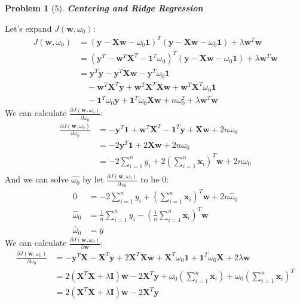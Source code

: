 \documentclass[11pt]{article}
\theoremstyle{quest}
\newtheorem*{question}{Problem}
\begin{document}
\begin{question}[5]
\textbf{Centering and Ridge Regression}
\end{question}
Let's expand $J(\textbf{w}, \omega_0)$:
\begin{align*}
J(\textbf{w}, \omega_0) &= (\textbf{y} - \textbf{X}\textbf{w} - \omega_{0}\textbf{1})^{T}(\textbf{y} - \textbf{X}\textbf{w} - \omega_{0}\textbf{1})+\lambda\textbf{w}^{T}\textbf{w}\\
 										&= (\textbf{y}^{T} - \textbf{w}^{T}\textbf{X}^{T} - \textbf{1}^{T}\omega_{0})^{T}(\textbf{y} - \textbf{X}\textbf{w} - \omega_{0}\textbf{1})+\lambda\textbf{w}^{T}\textbf{w}\\
										&= \textbf{y}^{T}\textbf{y} - \textbf{y}^{T}\textbf{Xw} - \textbf{y}^{T}\omega_{0}\textbf{1}\\
										&\quad - \textbf{w}^{T}\textbf{X}^{T}\textbf{y} + \textbf{w}^{T}\textbf{X}^{T}\textbf{X}\textbf{w} + \textbf{w}^{T}\textbf{X}^{T}\omega_0\textbf{1} \\
                    &\quad - \textbf{1}^{T}\omega_{0}\textbf{y} + \textbf{1}^{T}\omega_{0}\textbf{Xw} + n\omega_{0}^{2} + \lambda\textbf{w}^{T}\textbf{w}
\end{align*}
We can calculate $\frac{\partial J(\textbf{w}, \omega_0)}{\partial \omega_{0}}$:
\begin{align*}
\frac{\partial J(\textbf{w}, \omega_0)}{\partial \omega_{0}} &= -\textbf{y}^{T}\textbf{1} + \textbf{w}^{T}\textbf{X}^{T} -\textbf{1}^{T}\textbf{y} + \textbf{X}\textbf{w} + 2n\omega_{0}\\
&= -2\textbf{y}^{T}\textbf{1} + 2\textbf{Xw} + 2n\omega_{0}\\
&= -2\sum_{i=1}^{n}y_i + 2(\sum_{i=1}^{n}\textbf{x}_i)^{T}\textbf{w} + 2n\omega_{0}\\
\end{align*}
And we can solve $\hat{\omega_{0}}$ by let $\frac{\partial J(\textbf{w}, \omega_0)}{\partial \omega_{0}}$ to be 0:
\begin{align*}
0 &= -2\sum_{i=1}^{n}y_i + (\sum_{i=1}^{n}\textbf{x}_i)^{T}\textbf{w} + 2n\hat{\omega}_{0}\\
\hat{\omega}_{0} &= \frac{1}{n}\sum_{i=1}^{n}y_i - (\frac{1}{n}\sum_{i=1}^{n}\textbf{x}_i)^{T}\textbf{w}\\
\hat{\omega}_{0} &= \bar{y}
\end{align*}
We can calculate $\frac{\partial J(\textbf{w}, \omega_0)}{\partial \textbf{w}}$:
\begin{align*}
\frac{\partial J(\textbf{w}, \omega_0)}{\partial \omega_{0}} &= -\textbf{y}^{T}\textbf{X} - \textbf{X}^{T}\textbf{y} + 2\textbf{X}^{T}\textbf{X}\textbf{w} + \textbf{X}^{T}\omega_{0}\textbf{1} + \textbf{1}^{T}\omega_{0}\textbf{X} + 2\lambda\textbf{w}\\
&= 2(\textbf{X}^{T}\textbf{X} + \lambda\textbf{I})\textbf{w} - 2\textbf{X}^{T}\textbf{y} + \omega_{0}(\sum_{i=1}^{n}\textbf{x}_{i}) + \omega_{0}(\sum_{i=1}^{n}\textbf{x}_{i})^{T} \\
&= 2(\textbf{X}^{T}\textbf{X} + \lambda\textbf{I})\textbf{w} - 2\textbf{X}^{T}\textbf{y}
\end{align*}
\end{document}
